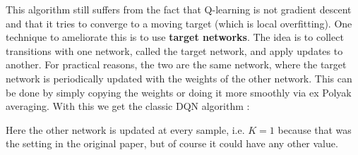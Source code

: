 This algorithm still suffers from the fact that Q-learning is not gradient descent and that 
it tries to converge to a moving target (which is local overfitting).
One technique to ameliorate this is to use \textbf{target networks}.
The idea is to collect transitions with one network, called the target network, 
and apply updates to another.
For practical reasons, the two are the same network, where the target network
is periodically updated with the weights of the other network.
This can be done by simply copying the weights or doing it more smoothly
via ex Polyak averaging.
With this we get the classic DQN algorithm \cite{mnih2013atari}:

Here the other network is updated at every sample, i.e. $   K=1$ because that was the setting
in the original paper, but of course it could have any other value.


